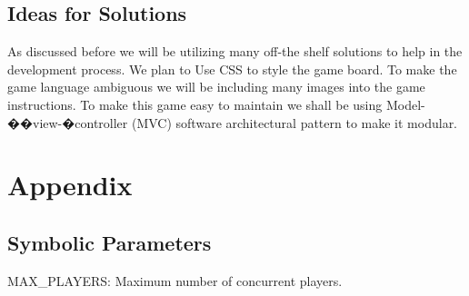 \documentclass[12pt, titlepage]{article}
\newcounter{funreq}
\newcommand{\frthefunreq}{FR\thefunreq}
\begin{document}
\subsection{Ideas for Solutions}
As discussed before we will be utilizing many off-the shelf solutions to help in
the development process. We plan to Use CSS to style the game board. To make the
game language ambiguous we will be including many images into the game
instructions. To make this game easy to maintain we shall be using
Model-��view-�controller (MVC) software architectural pattern to make it
modular.





\newpage

\section{Appendix}

\subsection{Symbolic Parameters}
MAX\_PLAYERS: Maximum number of concurrent players.


\end{document}
